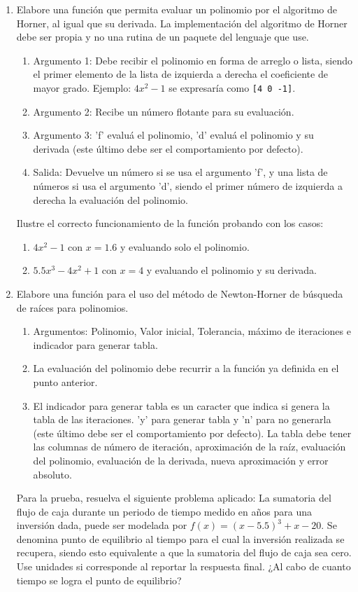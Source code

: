 \documentclass[12pt]{article}
\begin{document}
\vspace{-.5cm}
  \begin{enumerate}[leftmargin=*,widest=9]
    \item Elabore una función que permita evaluar un polinomio por el algoritmo de Horner, al igual que su derivada. La implementación del algoritmo de Horner debe ser propia y no una rutina de un paquete del lenguaje que use.
   \begin{enumerate}[label=\alph*]
    \item Argumento 1: Debe recibir el polinomio en forma de arreglo o lista, siendo el primer elemento de la lista de izquierda a derecha el coeficiente de mayor grado. Ejemplo: \(4x^2-1\) se expresaría como \verb+[4 0 -1]+.
    \item Argumento 2: Recibe un número flotante para su evaluación.
    \item Argumento 3: 'f' evaluá el polinomio, 'd' evaluá el polinomio y su derivada (este último debe ser el comportamiento por defecto).
    \item Salida: Devuelve un número si se usa el argumento 'f', y una lista de números si usa el argumento 'd', siendo el primer número de izquierda a derecha la evaluación del polinomio.
    \end{enumerate}
Ilustre el correcto funcionamiento de la función probando con los casos:
\begin{enumerate}[label=\roman*]
\item  \(4x^2-1\) con \(x=1.6\) y evaluando solo el polinomio.
\item \(5.5x^3 - 4x^2 + 1\) con \(x=4\) y evaluando el polinomio y su derivada.
 \end{enumerate}
    \item Elabore una función para el uso del método de Newton-Horner de búsqueda de raíces para polinomios.
    \begin{enumerate}[label=\alph*]
    \item Argumentos: Polinomio, Valor inicial, Tolerancia, máximo de iteraciones e indicador para generar tabla.
    \item La evaluación del polinomio debe recurrir a la función ya definida en el punto anterior.
	\item El indicador para generar tabla es un caracter que indica si genera la tabla de las iteraciones. 'y' para generar tabla y 'n' para no generarla (este último debe ser el comportamiento por defecto). La tabla debe tener las columnas de número de iteración, aproximación de la raíz, evaluación del polinomio, evaluación de la derivada, nueva aproximación y error absoluto.
\end{enumerate}
Para la prueba, resuelva el siguiente problema aplicado: La sumatoria del flujo de caja durante un periodo de tiempo medido en años para una inversión dada, puede ser modelada por \(f(x) = (x-5.5)^3 + x - 20\). Se denomina punto de equilibrio al tiempo para el cual la inversión realizada se recupera, siendo esto equivalente a que la sumatoria del flujo de caja sea cero. Use unidades si corresponde al reportar la respuesta final. ¿Al cabo de cuanto tiempo se logra el punto de equilibrio?
\end{enumerate}
\end{document}
